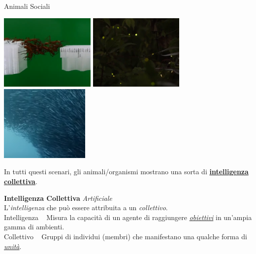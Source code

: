\documentclass[presentation, 10pt,aspectratio=169]{beamer}\mode<presentation>{\usetheme{AMSBolognaFC}}
\begin{document}
\begin{frame}[fragile]{Animali Sociali}
\begin{center}
	\href{https://youtu.be/IpKL-URul2I}{\includegraphics[height=3.7cm]{img/example.png}}
	\href{https://www.youtube.com/watch?v=ZGvtnE1Wy6U&t=37s}{\includegraphics[height=3.7cm]{img/fireflies.png}}
	\href{https://youtu.be/B6M_XgiONoo}{\includegraphics[height=3.7cm]{img/school.png}}
\end{center}
In tutti questi scenari, gli animali/organismi mostrano una sorta di \underline{\alert{\textbf{intelligenza collettiva}}}.
\end{frame}
{


\begin{frame}[c]
	
	{
	\color{customfg}

	\begin{center}
	\Large\textbf{Intelligenza Collettiva} \emph{Artificiale} \\
	
	L'\alert{\emph{intelligenza}} che può essere attribuita a un \alert{\emph{collettivo}}.
	\\ \vspace{1cm}
		\large{\alert{Intelligenza}} \faArrowRight ~ Misura la capacità di un agente di raggiungere \underline{\emph{obiettivi}} in un'ampia gamma di ambienti.  \\

		\large{\alert{Collettivo}} \faArrowRight ~ Gruppi di individui (membri) che manifestano una qualche forma di \underline{\emph{unità}}. \\

	\end{center}

	\vspace{1cm}	
}
\end{frame}
}
\end{document}
